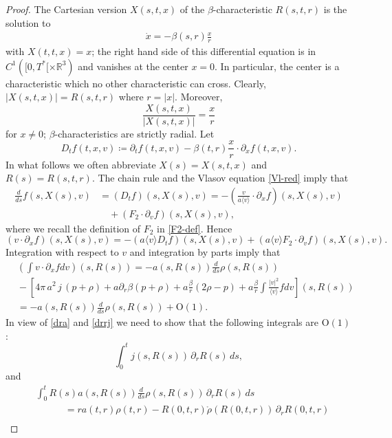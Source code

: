\documentclass[11pt]{article}
\def\R{\mathbb R}
\def\p0{\langle v \rangle}
\begin{document}
\begin{proof}
  The Cartesian version $X(s,t,x)$ of the $\beta$-characteristic $R(s,t,r)$
  is the solution to
  \begin{align}\label{X_beta}
    \dot x = - \beta(s,r)\frac{x}{r}
  \end{align}
  with $X(t,t,x) = x$;
  the right hand side of this differential equation
  is in $C^1([0,T^\ast[\times \R^3)$ and vanishes at the center $x=0$. In
  particular, the center is a characteristic which no other characteristic can cross.
  Clearly, $|X(s,t,x)|= R(s,t,r)$ where $r=|x|$.
  Moreover,
  \[
  \frac{X(s,t,x)}{|X(s,t,x)|} = \frac{x}{r}
  \]
  for $x\neq 0$; $\beta$-characteristics are strictly radial.
  Let
  \[
  D_t f(t,x,v) \coloneqq \partial_t f(t,x,v) -
  \beta(t,r) \frac{x}{r}\cdot \partial_x f (t,x,v).
  \]
  In what follows we often abbreviate
  $X(s) = X(s,t,x)$ and $R(s)=R(s,t,r)$.
  The chain rule and the Vlasov equation \eqref{Vl-red} imply that
  \begin{align*}
    \frac{d}{ds} f(s,X(s),v)
    &=
    (D_t f)(s,X(s),v) =
    -\left(\frac{v}{a \p0}\cdot \partial_x f\right)(s,X(s),v)\\
    &\quad {} + \left(F_{2} \cdot \partial_v f\right)(s,X(s),v),
  \end{align*}
  where we recall the definition of $F_2$ in \eqref{F2-def}. Hence
  \[
  \left(v \cdot \partial_x f\right)(s,X(s),v) =
  - \left(a \p0 D_t f\right)(s,X(s),v)
  + \left(a \p0 F_{2} \cdot \partial_v f\right)(s,X(s),v).
  \]
  Integration with respect to $v$ and integration by parts imply that
  \begin{align*}
    &
    \left(\int v \cdot \partial_x f dv\right) (s,R(s)) =
    - a(s,R(s)) \frac{d}{ds} \rho (s,R(s))\\
    &
    {}- 
    \left[4\pi \,a^2\, j\, (p+\rho)
      + a \partial_r\beta (p+\rho)
      + a \frac{\beta}{r} (2\rho-p)
      + a\frac{\beta}{r}\int \frac{|v|^2}{\p0}f dv \right] (s,R(s))\\
    &
    =- a(s,R(s)) \frac{d}{ds} \rho (s,R(s)) + \mathrm{O}(1).
  \end{align*}
  In view of \eqref{dra} and \eqref{drrj} we need to show that the following
  integrals are $\mathrm{O}(1)$:
  \[
  \int_0^t j(s,R(s))\,\partial_r R(s)\, ds,
  \]
  and
  \begin{align*}
    &
    \int_0^t R(s) a(s,R(s)) \frac{d}{ds} \rho (s,R(s))\, \partial_r R(s)\, ds\\
    &\qquad\quad =
    r a(t,r) \rho(t,r) - R(0,t,r)
    \mathring{\rho}(R(0,t,r))\,\partial_r R(0,t,r)\\

\end{align*}
\end{proof}
\end{document}
